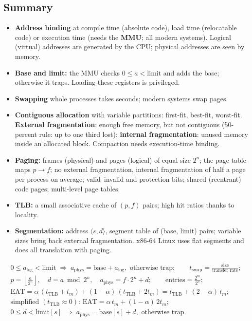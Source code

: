 \documentclass[11pt,a4paper]{article}
\newcommand{\term}[1]{\textbf{\color{mintdeep}#1}}
\begin{document}
\subsection*{Summary}
\begin{itemize}
  \item \textbf{Address binding} at compile time (absolute code), load time (relocatable code) or execution time (needs the \term{MMU}; all modern systems). Logical (virtual) addresses are generated by the CPU; physical addresses are seen by memory.
  \item \textbf{Base and limit:} the MMU checks $0 \le a < \text{limit}$ and adds the base; otherwise it traps. Loading these registers is privileged.
  \item \textbf{Swapping} whole processes takes seconds; modern systems swap pages.
  \item \textbf{Contiguous allocation} with variable partitions: first-fit, best-fit, worst-fit. \term{External fragmentation}: enough free memory, but not contiguous (50-percent rule: up to one third lost); \term{internal fragmentation}: unused memory inside an allocated block. Compaction needs execution-time binding.
  \item \textbf{Paging:} frames (physical) and pages (logical) of equal size $2^{n}$; the page table maps $p \to f$; no external fragmentation, internal fragmentation of half a page per process on average; valid--invalid and protection bits; shared (reentrant) code pages; multi-level page tables.
  \item \textbf{TLB:} a small associative cache of $(p, f)$ pairs; high hit ratios thanks to locality.
  \item \textbf{Segmentation:} address $\langle s, d\rangle$, segment table of (base, limit) pairs; variable sizes bring back external fragmentation. x86-64 Linux uses flat segments and does all translation with paging.
\end{itemize}

\begin{keyidea}
\begin{gather*}
0 \le a_{\text{log}} < \text{limit} \;\Rightarrow\; a_{\text{phys}} = \text{base} + a_{\text{log}}, \text{ otherwise trap}; \qquad
t_{\text{swap}} = \frac{\text{size}}{\text{transfer rate}};\\
p = \left\lfloor \frac{a}{2^{n}} \right\rfloor, \quad d = a \bmod 2^{n}, \quad a_{\text{phys}} = f\cdot 2^{n} + d; \qquad
\text{entries} = \frac{2^{m}}{2^{n}};\\
\text{EAT} = \alpha\,(t_{\text{TLB}} + t_{m}) + (1-\alpha)\,(t_{\text{TLB}} + 2t_{m}) = t_{\text{TLB}} + (2-\alpha)\,t_{m};\\
\text{simplified } (t_{\text{TLB}}\approx 0)\text{: } \text{EAT} = \alpha\,t_m + (1-\alpha)\,2t_m;\\
0 \le d < \text{limit}[s] \;\Rightarrow\; a_{\text{phys}} = \text{base}[s] + d, \text{ otherwise trap}.
\end{gather*}
\end{keyidea}
\end{document}
